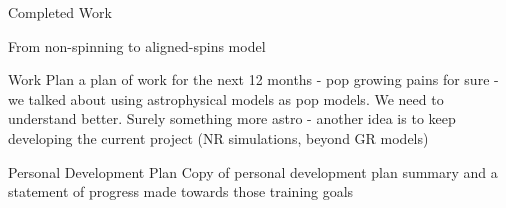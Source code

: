 \documentclass[a4paper, 12pt, twoside, openright, titlepage]{book}
\begin{document}
\begin{chapter}{Completed Work}
\begin{section}{From non-spinning to aligned-spins model}





\end{section}



\end{chapter}

\begin{chapter}{Work Plan}
a plan of work for the next 12 months
- pop growing pains for sure
- we talked about using astrophysical models as pop models. We need to understand better. Surely something more astro
- another idea is to keep developing the current project (NR simulations, beyond GR models)
\end{chapter}

\begin{chapter}{Personal Development Plan}
Copy of personal development plan summary and a statement of progress made towards those training goals
\end{chapter}

\appendix
%
%
%

\backmatter

\end{document}
